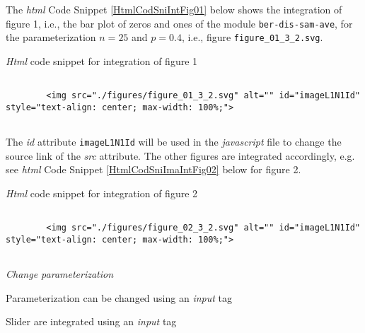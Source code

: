 \documentclass[12pt]{article}
\begin{document}
The \emph{html} Code Snippet \ref{HtmlCodSniIntFig01} below shows the integration of figure 1, i.e., the bar plot of zeros and ones of the module \texttt{ber-dis-sam-ave}, for the parameterization $n=25$ and $p=0.4$, i.e., figure \texttt{figure\_01\_3\_2.svg}. 
%
\begin{CodeSnippet}[!hp]
	\centering
	\caption{\emph{Html} code snippet for integration of figure 1}
	\tiny
	\vspace{0.25cm}
	\begin{BVerbatim}
		
		<img src="./figures/figure_01_3_2.svg" alt="" id="imageL1N1Id" style="text-align: center; max-width: 100%
		
	\end{BVerbatim}
	\label{HtmlCodSniIntFig01}
\end{CodeSnippet}
%
The \emph{id} attribute \texttt{imageL1N1Id} will be used in the \emph{javascript} file to change the source link of the \emph{src} attribute. 
%
The other figures are integrated accordingly, e.g. see \emph{html} Code Snippet \ref{HtmlCodSniImaIntFig02} below for figure 2. 
%  
\begin{CodeSnippet}[!hp]
	\centering
	\caption{\emph{Html} code snippet for integration of figure 2}
	\tiny
	\vspace{0.25cm}
	\begin{BVerbatim}
		
		<img src="./figures/figure_02_3_2.svg" alt="" id="imageL1N1Id" style="text-align: center; max-width: 100%
		
	\end{BVerbatim}
	\label{HtmlCodSniImaIntFig02}
\end{CodeSnippet}

\vspace{1em}
\noindent\emph{Change parameterization}

Parameterization can be changed using an \emph{input} tag

Slider are integrated using an \emph{input} tag %
\end{document}
